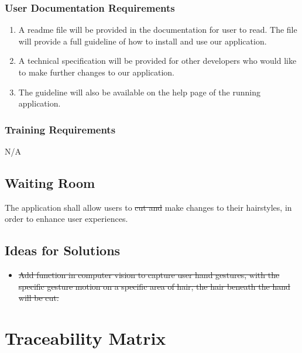\documentclass[12pt]{article}
\begin{document}
\subsubsection{User Documentation Requirements}
\begin{enumerate}
    \item A readme file will be provided in the documentation for user to read. The file will provide a full guideline of how to install and use our application.
    \item A technical specification will be provided for other developers who would like to make further changes to our application.
    \item The guideline will also be available on the help page of the running application.
\end{enumerate}
\subsubsection{Training Requirements}
N/A

\subsection{Waiting Room}

The application shall allow users to \sout{cut and} make changes to their hairstyles, in order to enhance user experiences.

\subsection{Ideas for Solutions}
\begin{itemize}
    \item\sout{ Add function in computer vision to capture user hand gestures, with the specific gesture motion on a specific area of hair, the hair beneath the hand will be cut.}
\end{itemize}

\section{Traceability Matrix}
\end{document}
